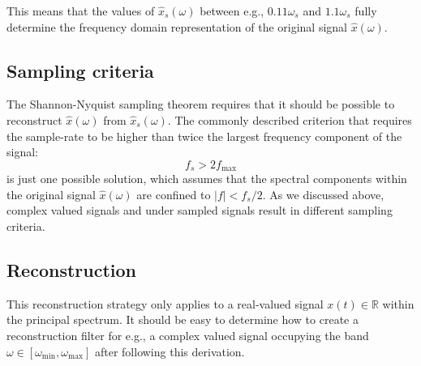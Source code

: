 This means that the values of $\hat{x}_s(\omega)$ between e.g., $0.11\omega_s$ and $1.1\omega_s$ fully determine the frequency domain representation of the original signal $\hat{x}(\omega)$.

\subsection{Sampling criteria}
The Shannon-Nyquist sampling theorem requires that it should be possible to reconstruct $\hat{x}(\omega)$ from
$\hat{x}_s(\omega)$. The commonly described criterion that requires the sample-rate to be higher than twice the largest frequency component of the signal:
\begin{equation}
f_s > 2 f_\mathrm{max} 
\end{equation}
is just one possible solution, which assumes that the spectral components within the original signal $\hat{x}(\omega)$ are confined to $|f| < f_s/2$. As we discussed above, complex valued signals and under sampled signals result in different sampling criteria.

\subsection{Reconstruction}
This reconstruction strategy only applies to a real-valued signal $x(t) \in \mathbb{R}$ within the principal spectrum. It should be easy to determine how to create a reconstruction filter for e.g., a complex valued signal occupying the band $\omega \in
[\omega_{\mathrm{min}},\omega_{\mathrm{max}}]$ after following this derivation.

